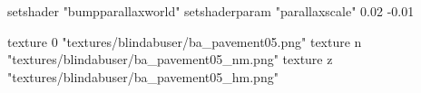 	setshader "bumpparallaxworld"
	setshaderparam "parallaxscale" 0.02 -0.01

		texture 0 "textures/blindabuser/ba_pavement05.png"
		texture n "textures/blindabuser/ba_pavement05_nm.png"
		texture z "textures/blindabuser/ba_pavement05_hm.png"
